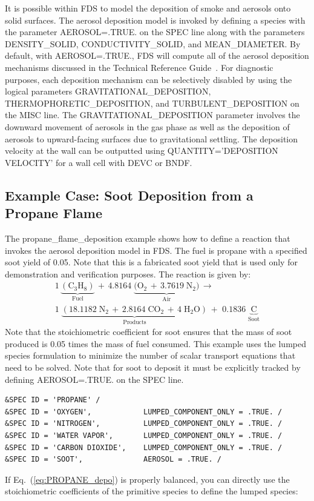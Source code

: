 \documentclass[11pt]{book}
\begin{document}
It is possible within FDS to model the deposition of smoke and aerosols onto solid surfaces. The aerosol deposition model is invoked by defining a species with the parameter {\ct AEROSOL=.TRUE.} on the {\ct SPEC} line along with the parameters {\ct DENSITY\_SOLID}, {\ct CONDUCTIVITY\_SOLID}, and {\ct MEAN\_DIAMETER}. By default, with {\ct AEROSOL=.TRUE.}, FDS will compute all of the aerosol deposition mechanisms discussed in the Technical Reference Guide~\cite{FDS_Math_Guide}. For diagnostic purposes, each deposition mechanism can be selectively disabled by using the logical parameters {\ct GRAVITATIONAL\_DEPOSITION}, {\ct THERMOPHORETIC\_DEPOSITION}, and {\ct TURBULENT\_DEPOSITION} on the {\ct MISC} line. The {\ct GRAVITATIONAL\_DEPOSITION} parameter involves the downward movement of aerosols in the gas phase as well as the deposition of aerosols to upward-facing surfaces due to gravitational settling.  The deposition velocity at the wall can be outputted using {\ct QUANTITY='DEPOSITION VELOCITY'} for a wall cell with {\ct DEVC} or {\ct BNDF}.

\subsection{Example Case: Soot Deposition from a Propane Flame}

The {\ct propane\_flame\_deposition} example shows how to define a reaction that invokes the aerosol deposition model in FDS. The fuel is propane with a specified soot yield of 0.05. Note that this is a fabricated soot yield that is used only for demonstration and verification purposes. The reaction is given by:
\begin{multline}\label{eq:PROPANE_depo}
1\,\underbrace{\mathrm{(C_3H_8)}}_\text{Fuel} \,+\, 4.8164 \; \underbrace{\mathrm{(O_2\,+\, 3.7619 \; N_2})}_\text{Air} \, \longrightarrow \\
1 \; \underbrace{\mathrm{(18.1182 \; N_2 \, + \, 2.8164 \; CO_2 \,+ \, 4\; H_2O)}}_\text{Products} \,+\,
\,0.1836 \; \underbrace{\mathrm{C}}_\text{Soot}
\end{multline}
Note that the stoichiometric coefficient for soot ensures that the mass of soot produced is 0.05 times the mass of fuel consumed. This example uses the lumped species formulation to minimize the number of scalar transport equations that need to be solved. Note that for soot to deposit it must be explicitly tracked by defining {\ct AEROSOL=.TRUE.} on the {\ct SPEC} line.
\begin{lstlisting}
&SPEC ID = 'PROPANE' /
&SPEC ID = 'OXYGEN',            LUMPED_COMPONENT_ONLY = .TRUE. /
&SPEC ID = 'NITROGEN',          LUMPED_COMPONENT_ONLY = .TRUE. /
&SPEC ID = 'WATER VAPOR',       LUMPED_COMPONENT_ONLY = .TRUE. /
&SPEC ID = 'CARBON DIOXIDE',    LUMPED_COMPONENT_ONLY = .TRUE. /
&SPEC ID = 'SOOT',              AEROSOL = .TRUE. /
\end{lstlisting}
If Eq.~(\ref{eq:PROPANE_depo}) is properly balanced, you can directly use the stoichiometric coefficients of the primitive species to define the lumped species:
\end{document}
